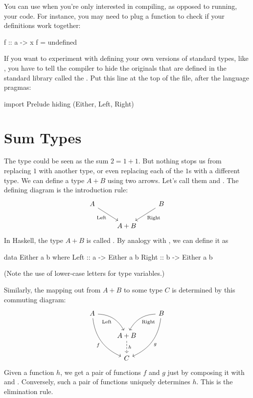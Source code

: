 \documentclass[DaoFP]{subfiles}
\begin{document}
You can use  when you're only interested in compiling, as opposed to running, your code. For instance, you may need to plug a function  to check if your definitions work together:
\begin{haskell}
f :: a -> x
f = undefined
\end{haskell}

If you want to experiment with defining your own versions of standard types, like , you have to tell the compiler to hide the originals that are defined in the standard library called the . Put this line at the top of the file, after the language pragmas:
\begin{haskell}
import Prelude hiding (Either, Left, Right)
\end{haskell}


\section{Sum Types}

The  type could be seen as the sum $2 = 1 + 1$. But nothing stops us from replacing $1$ with another type, or even replacing each of the $1$s with a different type. We can define a type $A + B$ using two arrows. Let's call them  and . The defining diagram is the introduction rule:
\[
 \begin{tikzcd}
 A
 \arrow[dr,  "\text{Left}"']
 && B
 \arrow[dl, "\text{Right}"]
 \\
&A + B
 \end{tikzcd}
\]
In Haskell, the type $A + B$ is called . By analogy with , we can define it as
\begin{haskell}
data Either a b where
  Left  :: a -> Either a b
  Right :: b -> Either a b
\end{haskell}
 (Note the use of lower-case letters for type variables.)
 
Similarly, the mapping out from $A + B$ to some type $C$ is determined by this commuting diagram:
\[
 \begin{tikzcd}
 A
 \arrow[dr,  bend left, "\text{Left}"']
 \arrow[ddr, bend right, "f"']
 && B
 \arrow[dl, bend right, "\text{Right}"]
 \arrow[ddl, bend left, "g"]
 \\
&A + B
\arrow[d, dashed, "h"]
\\
& C
 \end{tikzcd}
\]
Given a function $h$, we get a pair of functions $f$ and $g$ just by composing it with  and . Conversely, such a pair of functions uniquely determines $h$. This is the elimination rule.
\end{document}
